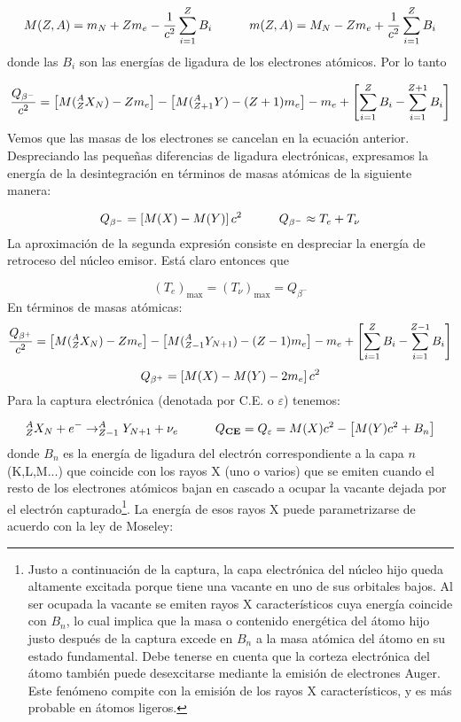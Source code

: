 \begin{equation*}
	M(Z,A) = m_N + Zm_e - \frac{1}{c^2} \sum_{i=1}^Z B_i \quad \quad \quad
	m(Z,A) = M_N - Zm_e + \frac{1}{c^2} \sum_{i=1}^Z B_i
\end{equation*}
donde las $B_i$ son las energías de ligadura de los electrones atómicos. Por lo tanto

\begin{equation}
	\frac{Q_{\beta^-}}{c^2} = \left[ M(^A_ZX_N) - Zm_e \right] - \left[ M(_{Z+1}^A Y)-(Z+1)m_e \right]  - m_e + \left[ \sum_{i=1}^{Z} B_i - \sum_{i=1}^{Z+1} B_i \right]
\end{equation}
Vemos que las masas de los electrones se cancelan en la ecuación anterior. Despreciando las pequeñas diferencias de ligadura electrónicas, expresamos la energía de la desintegración en términos de masas atómicas de la siguiente manera:

\begin{equation}
	Q_ {\beta^-} = \left[ M(X)-M(Y) \right] c^2 \quad \quad \quad Q_{\beta^-} \approx T_e + T_\nu
\end{equation}
La aproximación de la segunda expresión consiste en despreciar la energía de retroceso del núcleo emisor. Está claro entonces que

\begin{equation}
	(T_e)_{\max} = (T_\nu)_{\max} = Q_{\beta^-}
\end{equation}
En términos de masas atómicas:
\begin{equation}
	\frac{Q_{\beta^+}}{c^2} = \left[ M(^A_ZX_N) - Zm_e \right] - \left[ M(_{Z-1}^A Y_ {N+1})-(Z-1)m_e \right]  - m_e + \left[ \sum_{i=1}^{Z} B_i - \sum_{i=1}^{Z-1} B_i \right]
\end{equation}
\begin{equation}
	Q_ {\beta^+} = \left[ M(X)-M(Y)-2m_e \right] c^2 
\end{equation}
Para la captura electrónica (denotada por C.E. o $\varepsilon$) tenemos:

\begin{equation}
	^A_ZX_N + e^- \rightarrow ^A_{Z-1} Y_{N+1} + \nu_e \quad \quad \quad Q_{\textbf{CE}} = Q_\varepsilon = M(X) c^2 - \left[ M(Y)c^2+ B_n \right]
\end{equation}
donde $B_n$ es la energía de ligadura del electrón correspondiente a la capa $n$ (K,L,M...) que coincide con los rayos X (uno o varios) que se emiten cuando el resto de los electrones atómicos bajan en cascado a ocupar la vacante dejada por el electrón capturado\footnote{Justo a continuación de la captura, la capa electrónica del núcleo hijo queda altamente excitada porque tiene una vacante en uno de sus orbitales bajos. Al ser ocupada la vacante se emiten rayos X característicos cuya energía coincide con $B_n$, lo cual implica que la masa o contenido energética del átomo hijo justo después de la captura excede en $B_n$ a la masa atómica del átomo en su estado fundamental. Debe tenerse en cuenta que la corteza electrónica del átomo también puede desexcitarse mediante la emisión de electrones Auger. Este fenómeno compite con la emisión de los rayos X característicos, y es más probable en átomos ligeros.}. La energía de esos rayos X puede parametrizarse de acuerdo con la ley de Moseley:

